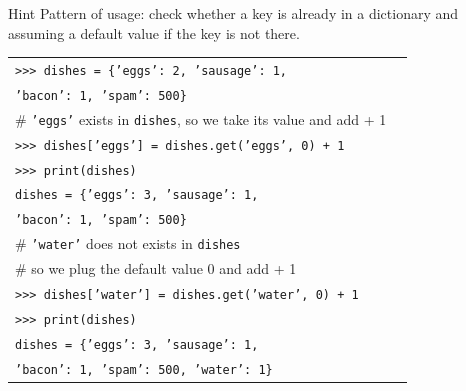 \documentclass[t,handout,9pt]{beamer}
\begin{document}
\begin{frame}
\vfill
\begin{block}{Hint}
Pattern of usage: check whether a key is already in a dictionary and assuming a default value if the key is not there.
\end{block}
\begin{table}[]
\begin{flushleft}
\begin{tabular}{ll}
\texttt{>{}>{}> dishes = \{'eggs': 2, 'sausage': 1,} &   \\
\texttt{\qquad 'bacon': 1, 'spam': 500\}} &   \\
\# \texttt{'eggs'} exists in \texttt{dishes}, so we take its value and add + 1 &   \\
\texttt{>{}>{}> dishes['eggs'] = dishes.get('eggs', 0) + 1} &   \\
\texttt{>{}>{}> print(dishes)} &   \\
\texttt{dishes = \{'eggs': 3, 'sausage': 1,} &   \\
\texttt{\qquad 'bacon': 1, 'spam': 500\}} &   \\
\# \texttt{'water'} does not exists in \texttt{dishes} &   \\
\# so we plug the default value 0 and add + 1 &   \\
\texttt{>{}>{}> dishes['water'] = dishes.get('water', 0) + 1} &   \\
\texttt{>{}>{}> print(dishes)} &   \\
\texttt{dishes = \{'eggs': 3, 'sausage': 1,} &   \\
\texttt{\qquad 'bacon': 1, 'spam': 500, 'water': 1\}} &   \\
\end{tabular}
\end{flushleft}
\end{table}
\vfill
\end{frame}
%
\end{document}

